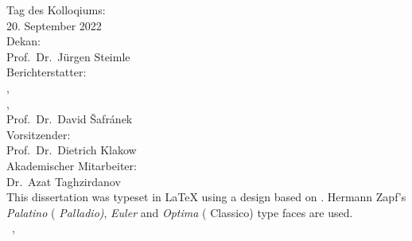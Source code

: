 \thispagestyle{empty}

\hfill
\vfill

{\raggedright
\noindent
Tag des Kolloqiums: \\
\hspace*{20pt}20. September 2022 \\
Dekan:\\
\hspace*{20pt}Prof.\ Dr.\ Jürgen Steimle\\
Berichterstatter:\\
\hspace*{20pt}\myProf,\\
\hspace*{20pt}\myOtherProf,\\
\hspace*{20pt}Prof.\ Dr.\ David Šafránek \\
Vorsitzender: \\
\hspace*{20pt}Prof.\ Dr.\ Dietrich Klakow\\
Akademischer Mitarbeiter:\\
\hspace{20pt}Dr.\ Azat Taghzirdanov\\
\bigskip
\noindent
This dissertation was typeset in \LaTeX{}  using a design based on \texttt{\classicthesis}.
Hermann Zapf's \emph{Palatino} (\emph{ Palladio)}, \emph{Euler} and \emph{Optima} ( Classico) type faces are used.\\
\bigskip
\noindent
\textcopyright\ \myName, \myTime
}
